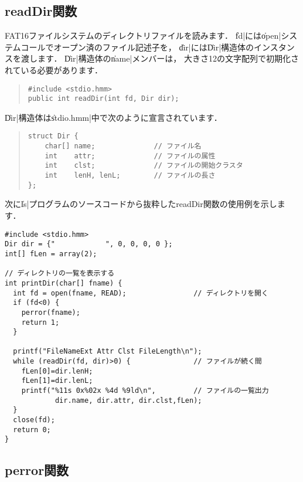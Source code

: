\subsection{readDir関数}
\label{chap4:readDir}

FAT16ファイルシステムのディレクトリファイルを読みます．
\|fd|には\|open|システムコールでオープン済のファイル記述子を，
\|dir|には\|Dir|構造体のインスタンスを渡します．
\|Dir|構造体の\|name|メンバーは，
大きさ12の文字配列で初期化されている必要があります．

\begin{quote}
\begin{verbatim}
#include <stdio.hmm>
public int readDir(int fd, Dir dir);
\end{verbatim}
\end{quote}

\|Dir|構造体は\|stdio.hmm|中で次のように宣言されています．

\begin{quote}
\begin{verbatim}
struct Dir {
    char[] name;              // ファイル名
    int    attr;              // ファイルの属性
    int    clst;              // ファイルの開始クラスタ
    int    lenH, lenL;        // ファイルの長さ
};
\end{verbatim}
\end{quote}

次に\|ls|プログラムのソースコードから抜粋したreadDir関数の使用例を示します．

\begin{mylist}
\begin{verbatim}
#include <stdio.hmm>
Dir dir = {"            ", 0, 0, 0, 0 };
int[] fLen = array(2);

// ディレクトリの一覧を表示する
int printDir(char[] fname) {
  int fd = open(fname, READ);                // ディレクトリを開く
  if (fd<0) {
    perror(fname);
    return 1;
  }

  printf("FileNameExt Attr Clst FileLength\n");
  while (readDir(fd, dir)>0) {               // ファイルが続く間
    fLen[0]=dir.lenH;
    fLen[1]=dir.lenL;
    printf("%11s 0x%02x %4d %9ld\n",         // ファイルの一覧出力
            dir.name, dir.attr, dir.clst,fLen);
  }
  close(fd);
  return 0;
}
\end{verbatim}
\end{mylist}

\subsection{perror関数}

